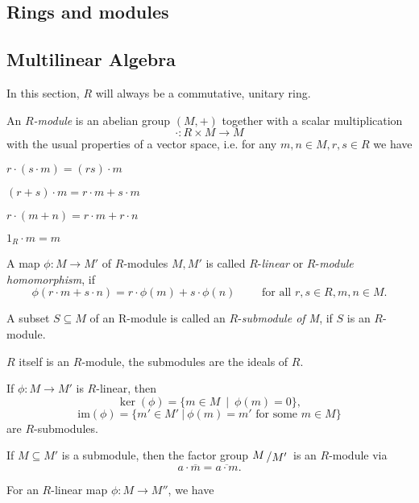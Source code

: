 \documentclass[11pt]{book}
\theoremstyle{nonumberbreak}
\newenvironment{er}[1][]{\ifthenelse{\equal{#1}{}}{\erinner}{\erinner[#1]}\rm}{\enderinner}
\newcommand{\slant}[2]{{\raisebox{.1em}{$#1$}\left/\raisebox{-.1em}{$#2$}\right.}}
\begin{document}
\begin{spacing}{1.3}
\chapter{Rings and modules}
\thispagestyle{empty}

\setcounter{section}{10}
\renewcommand*\thesection{§ \arabic{section}\quad }
\section{Multilinear Algebra}
\renewcommand*\thesection{\arabic{section}}

In this section, $R$ will always be a commutative, unitary ring.

\begin{er} %
\begin{compactenum}
\item An $R$\textit{-module} is an abelian group $(M,+)$ together with a scalar multiplication
$$\cdot: R \times M \longrightarrow M$$
with the usual properties of a vector space, i.e. for any $m,n \in M, r,s \in R$ we have
\begin{compactenum}
\item $r \cdot (s \cdot m)= (r s) \cdot m$
\item $(r+s)\cdot m= r\cdot m + s \cdot m$
\item $r \cdot (m+n)=r \cdot m + r \cdot n$
\item $1_R \cdot m =m$
\end{compactenum}
\item A map
$\phi:M \longrightarrow M'$
of $R$-modules $M, M'$ is called $R$-\textit{linear} or $R$-\textit{module homomorphism}, if 
$$\phi(r\cdot m+s\cdot n)=r\cdot \phi(m)+s\cdot\phi(n) \qquad \textrm{ for all } r,s \in R, m,n \in M.$$
\item  A subset $S\subseteq M$ of an R-module is called an $R$-\textit{submodule of M}, if $S$ is an $R$-module.
\item $R$ itself is an $R$-module, the submodules are the ideals of $R$.
\item If $\phi:M \longrightarrow M'$ is $R$-linear, then 
$$\ker(\phi)= \{m \in M\ \mid\ \phi(m)=0\},$$
$$\textrm{im}(\phi)=\{m' \in M'\ \vert\ \phi(m)=m' \textrm{ for some } m \in M\}$$
are $R$-submodules.
\item If $M \subseteq M'$ is a submodule, then the factor group $\slant{M}{M'}$ is an $R$-module via
$$a \cdot \overline{m}= \overline{a\cdot m}.$$
\item For an $R$-linear map $\phi: M \longrightarrow M''$, we have

\end{compactenum}
\end{er}
\end{spacing}
\end{document}
